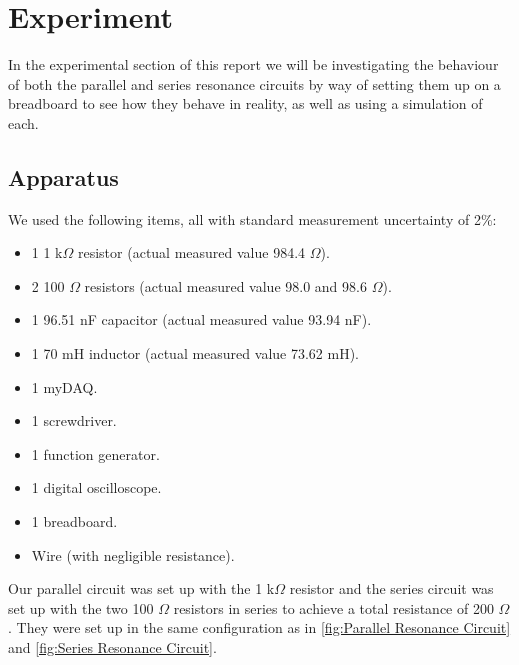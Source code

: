 \documentclass[12pt]{article}
\numberwithin{equation}{section}
\numberwithin{figure}{section}
\begin{document}
    \section{Experiment}\label{sec:Experiment}
    In the experimental section of this report we will be investigating the behaviour of both the 
    parallel and series resonance circuits by way of setting them up on a breadboard to see how they 
    behave in reality, as well as using a simulation of each. 
    \subsection{Apparatus}\label{sec:Apparatus}
    We used the following items, all with standard measurement uncertainty of 2\%:
    \begin{itemize}
        \item 1 1 k$\Omega$ resistor (actual measured value 984.4 $\Omega$).
        \item 2 100 $\Omega$ resistors (actual measured value 98.0 and 98.6 $\Omega$).
        \item 1 96.51 nF capacitor (actual measured value 93.94 nF).
        \item 1 70 mH inductor (actual measured value 73.62 mH).
        \item 1 myDAQ.
        \item 1 screwdriver.
        \item 1 function generator.
        \item 1 digital oscilloscope.
        \item 1 breadboard.
        \item Wire (with negligible resistance).
    \end{itemize}
    Our parallel circuit was set up with the 1 k$\Omega$ resistor and the series circuit was set up 
    with the two 100 $\Omega$ resistors in series to achieve a total resistance of 200 $\Omega$. 
    They were set up in the same configuration as in \autoref{fig:Parallel Resonance Circuit} and 
    \autoref{fig:Series Resonance Circuit}. 
\end{document}
